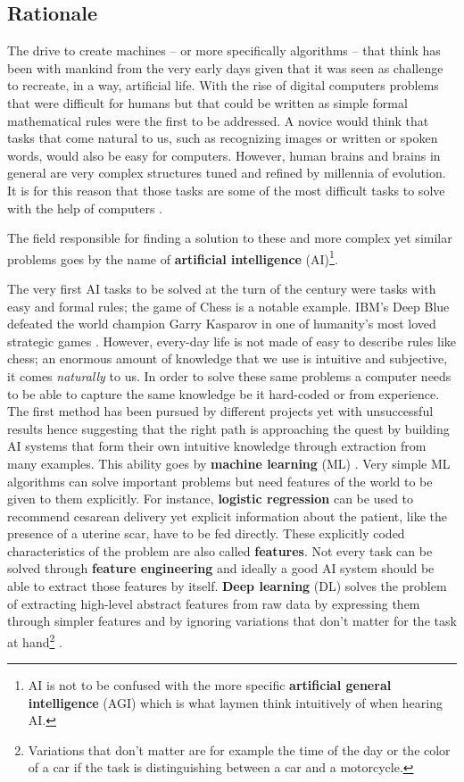 \subsection{Rationale} \label{sec:rationale}
The drive to create machines -- or more specifically algorithms -- that think has been with mankind from the very early days given that it was seen as challenge to recreate, in a way, artificial life.
With the rise of digital computers problems that were difficult for humans but that could be written as simple formal mathematical rules were the first to be addressed. A novice would think that tasks that come natural to us, such as recognizing images or written or spoken words, would also be easy for computers. However, human brains and brains in general are very complex structures tuned and refined by millennia of evolution. It is for this reason that those tasks are some of the most difficult tasks to solve with the help of computers \citep{Goodfellow2016}.

The field responsible for finding a solution to these and more complex yet similar problems goes by the name of \textbf{artificial intelligence} (AI)\footnote{ AI is not to be confused with the more specific \textbf{artificial general intelligence} (AGI) which is what laymen think intuitively of when hearing AI.}.

The very first AI tasks to be solved at the turn of the century were tasks with easy and formal rules; the game of Chess is a notable example. IBM's Deep Blue defeated the world champion Garry Kasparov in one of humanity's most loved strategic games \citep{Campbell2002DeepBlue}. However, every-day life is not made of easy to describe rules like chess; an enormous amount of knowledge that we use is intuitive and subjective, it comes \textit{naturally} to us. In order to solve these same problems a computer needs to be able to capture the same knowledge be it hard-coded or from experience. The first method has been pursued by different projects yet with unsuccessful results hence suggesting that the right path is approaching the quest by building AI systems that form their own intuitive knowledge through extraction from many examples. This ability goes by \textbf{machine learning} (ML) \citep{Goodfellow2016}.
Very simple ML algorithms can solve important problems but need features of the world to be given to them explicitly. For instance, \textbf{logistic regression} can be used to recommend cesarean delivery \citet{Mor-Yosef1990RankingStudy.} yet explicit information about the patient, like the presence of a uterine scar, have to be fed directly. These explicitly coded characteristics of the problem are also called \textbf{features}.
Not every task can be solved through \textbf{feature engineering} and ideally a good AI system should be able to extract those features by itself. \textbf{Deep learning} (DL) solves the problem of extracting high-level abstract features from raw data by expressing them through simpler features and by ignoring variations that don't matter for the task at hand\footnote{Variations that don't matter are for example the time of the day or the color of a car if the task is distinguishing between a car and a motorcycle.} \citep{Goodfellow2016}.

